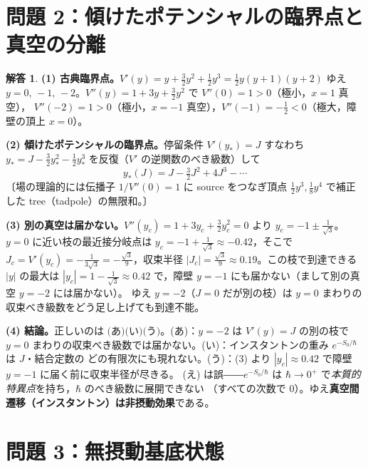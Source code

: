 \documentclass[dvipdfmx, uplatex]{jsarticle}
\newcommand{\hb}{\hbar}
\theoremstyle{definition}
\newtheorem*{sol}{解答}
\begin{document}
\section{問題 2：傾けたポテンシャルの臨界点と真空の分離}

\begin{sol}
\textbf{(1) 古典臨界点。}$V'(y)=y+\tfrac32y^2+\tfrac12y^3=\tfrac12 y(y+1)(y+2)$ ゆえ
$\boxed{y=0,\,-1,\,-2}$。$V''(y)=1+3y+\tfrac32y^2$ で $V''(0)=1>0$（極小，$x=1$ 真空），
$V''(-2)=1>0$（極小，$x=-1$ 真空），$V''(-1)=-\tfrac12<0$（極大，障壁の頂上 $x=0$）。

\textbf{(2) 傾けたポテンシャルの臨界点。}停留条件 $V'(y_*)=J$ すなわち
$y_*=J-\tfrac32y_*^2-\tfrac12y_*^3$ を反復（$V'$ の逆関数のべき級数）して
\[
    \boxed{\,y_*(J)=J-\tfrac32J^2+4J^3-\cdots\,}
\]
〔場の理論的には伝播子 $1/V''(0)=1$ に source をつなぎ頂点 $\tfrac12y^3,\tfrac18y^4$ で補正した
tree（tadpole）の無限和。〕

\textbf{(3) 別の真空は届かない。}$V''(y_c)=1+3y_c+\tfrac32y_c^2=0$ より $y_c=-1\pm\tfrac1{\sqrt3}$。
$y=0$ に近い枝の最近接分岐点は $\boxed{y_c=-1+\tfrac1{\sqrt3}\approx-0.42}$，そこで
$J_c=V'(y_c)=-\tfrac1{3\sqrt3}=-\tfrac{\sqrt3}{9}$，収束半径
$\boxed{|J_c|=\tfrac{\sqrt3}{9}\approx0.19}$。この枝で到達できる $|y|$ の最大は
$\boxed{|y_c|=1-\tfrac1{\sqrt3}\approx0.42}$ で，障壁 $y=-1$ にも届かない（まして別の真空 $y=-2$ には届かない）。
ゆえ $y=-2$（$J=0$ だが別の枝）は $y=0$ まわりの収束べき級数をどう足し上げても到達不能。

\textbf{(4) 結論。}正しいのは $\boxed{\text{(あ)(い)(う)}}$。(あ)：$y=-2$ は $V'(y)=J$ の別の枝で
$y=0$ まわりの収束べき級数では届かない。(い)：インスタントンの重み $e^{-S_0/\hb}$ は $J$・結合定数の
どの有限次にも現れない。(う)：(3) より $|y_c|\approx0.42$ で障壁 $y=-1$ に届く前に収束半径が尽きる。
(え) は誤――$e^{-S_0/\hb}$ は $\hb\to0^+$ で\emph{本質的特異点}を持ち，$\hb$ のべき級数に展開できない
（すべての次数で $0$）。ゆえ\textbf{真空間遷移（インスタントン）は非摂動効果}である。
\end{sol}

\section{問題 3：無摂動基底状態}
\end{document}
